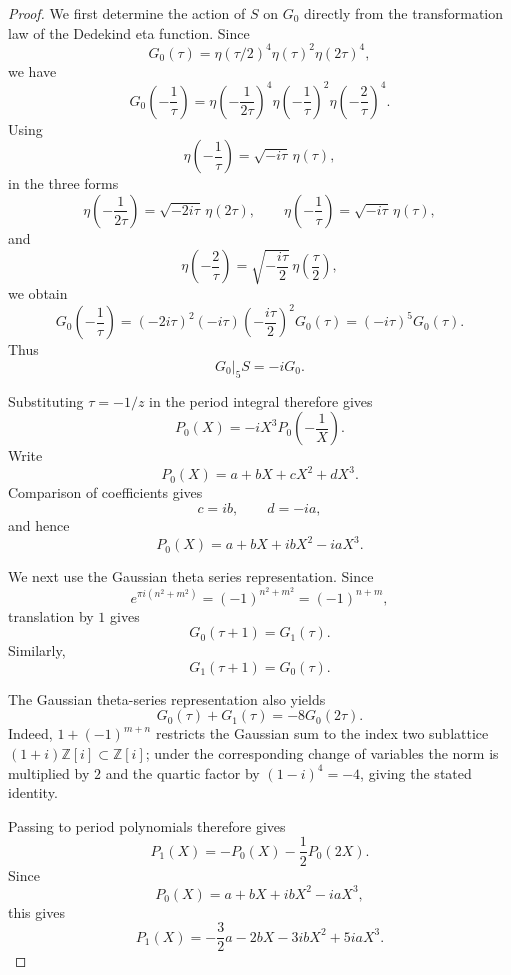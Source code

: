\documentclass[10pt,a4paper]{amsart}
\begin{document}
\begin{proof}
	We first determine the action of $S$ on $G_0$ directly from the transformation law of the Dedekind eta function.  Since
	\[
	G_0(\tau)=\eta(\tau/2)^4\eta(\tau)^2\eta(2\tau)^4,
	\]
	we have
	\[
	G_0\left(-\frac{1}{\tau}\right)
	=
	\eta\left(-\frac{1}{2\tau}\right)^4
	\eta\left(-\frac{1}{\tau}\right)^2
	\eta\left(-\frac{2}{\tau}\right)^4.
	\]
	Using
	\[
	\eta\left(-\frac{1}{\tau}\right)=\sqrt{-i\tau}\,\eta(\tau),
	\]
	in the three forms
	\[
	\eta\left(-\frac{1}{2\tau}\right)=\sqrt{-2i\tau}\,\eta(2\tau),
	\qquad
	\eta\left(-\frac{1}{\tau}\right)=\sqrt{-i\tau}\,\eta(\tau),
	\]
	and
	\[
	\eta\left(-\frac{2}{\tau}\right)
	=
	\sqrt{-\frac{i\tau}{2}}\,\eta\left(\frac{\tau}{2}\right),
	\]
	we obtain
	\[
	G_0\left(-\frac{1}{\tau}\right)
	=
	(-2i\tau)^2(-i\tau)\left(-\frac{i\tau}{2}\right)^2
	G_0(\tau)
	=
	(-i\tau)^5G_0(\tau).
	\]
	Thus
	\[
	G_0|_5S=-iG_0.
	\]
	
	Substituting $\tau=-1/z$ in the period integral therefore gives
	\[
	P_0(X)=-iX^3P_0\left(-\frac{1}{X}\right).
	\]
	Write
	\[
	P_0(X)=a+bX+cX^2+dX^3.
	\]
	Comparison of coefficients gives
	\[
	c=ib,\qquad d=-ia,
	\]
	and hence
	\[
	P_0(X)=a+bX+ibX^2-iaX^3.
	\]
	
	We next use the Gaussian theta series representation.  Since
	\[
	e^{\pi i(n^2+m^2)}=(-1)^{n^2+m^2}=(-1)^{n+m},
	\]
	translation by $1$ gives
	\[
	G_0(\tau+1)=G_1(\tau).
	\]
	Similarly,
	\[
	G_1(\tau+1)=G_0(\tau).
	\]
	
The Gaussian theta-series representation also yields
\[
G_0(\tau)+G_1(\tau)=-8G_0(2\tau).
\]
Indeed, $1+(-1)^{m+n}$ restricts the Gaussian sum to the index two
sublattice $(1+i)\mathbb Z[i]\subset\mathbb Z[i]$; under the corresponding
change of variables the norm is multiplied by $2$ and the quartic factor by
$(1-i)^4=-4$, giving the stated identity.	
	
	
	
	
%	
Passing to period polynomials therefore gives
\[
P_1(X)=-P_0(X)-\frac12P_0(2X).
\]
	Since
	\[
	P_0(X)=a+bX+ibX^2-iaX^3,
	\]
	this gives
	\[
	P_1(X)
	=
	-\frac{3}{2}a-2bX-3ibX^2+5iaX^3.
	\]
	

\end{proof}
\end{document}
